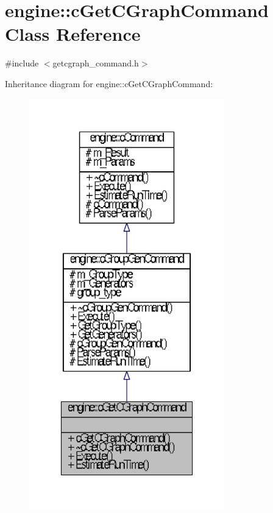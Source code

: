 \hypertarget{classengine_1_1cGetCGraphCommand}{\section{engine\-:\-:c\-Get\-C\-Graph\-Command \-Class \-Reference}
\label{classengine_1_1cGetCGraphCommand}
}


{\ttfamily \#include $<$getcgraph\-\_\-command.\-h$>$}



\-Inheritance diagram for engine\-:\-:c\-Get\-C\-Graph\-Command\-:\nopagebreak
\begin{figure}[H]
\begin{center}
\leavevmode
\includegraphics[width=240pt]{classengine_1_1cGetCGraphCommand__inherit__graph}
\end{center}
\end{figure}


